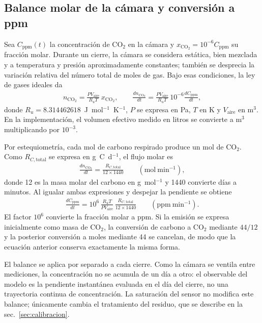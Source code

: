 \subsection{Balance molar de la cámara y conversión a ppm}

\label{sup:balance}
Sea $C_{\mathrm{ppm}}(t)$ la concentración de CO$_2$ en la cámara y
$x_{\mathrm{CO_2}} = 10^{-6}C_{\mathrm{ppm}}$ su fracción molar. Durante un
cierre, la cámara se considera estática, bien mezclada y a temperatura y
presión aproximadamente constantes; también se desprecia la variación
relativa del número total de moles de gas. Bajo esas condiciones, la ley de
gases ideales da
\begin{align*}
n_{\mathrm{CO_2}}
  = \frac{P V_{\mathrm{aire}}}{R_u T}\,x_{\mathrm{CO_2}},
\qquad
\frac{dn_{\mathrm{CO_2}}}{dt}
  = \frac{P V_{\mathrm{aire}}}{R_u T}\,10^{-6}
    \frac{dC_{\mathrm{ppm}}}{dt},
\end{align*}
donde $R_u = 8.314462618$~J~mol$^{-1}$~K$^{-1}$, $P$ se expresa en Pa,
$T$ en K y $V_{\mathrm{aire}}$ en m$^3$. En la implementación, el volumen
efectivo medido en litros se convierte a m$^3$ multiplicando por $10^{-3}$.

Por estequiometría, cada mol de carbono respirado produce un mol de CO$_2$.
Como $R_{C,\mathrm{total}}$ se expresa en g~C~d$^{-1}$, el flujo molar es
\begin{align*}
\frac{dn_{\mathrm{CO_2}}}{dt}
  = \frac{R_{C,\mathrm{total}}}{12 \times 1440}
  \qquad (\mathrm{mol~min^{-1}}),
\end{align*}
donde 12 es la masa molar del carbono en g~mol$^{-1}$ y 1440 convierte días
a minutos. Al igualar ambas expresiones y despejar la pendiente se obtiene
\begin{align*}
\frac{dC_{\mathrm{ppm}}}{dt}
  = 10^{6}\,\frac{R_u T}{P V_{\mathrm{aire}}}\,
    \frac{R_{C,\mathrm{total}}}{12 \times 1440}
  \qquad (\mathrm{ppm~min^{-1}}).
\end{align*}
El factor $10^6$ convierte la fracción molar a ppm. Si la emisión se expresa
inicialmente como masa de CO$_2$, la conversión de carbono a CO$_2$ mediante
$44/12$ y la posterior conversión a moles mediante 44 se cancelan, de modo
que la ecuación anterior conserva exactamente la misma forma.

El balance se aplica por separado a cada cierre. Como la cámara se ventila
entre mediciones, la concentración no se acumula de un día a otro: el
observable del modelo es la pendiente instantánea evaluada en el día del
cierre, no una trayectoria continua de concentración. La saturación del
sensor no modifica este balance; únicamente cambia el tratamiento del
residuo, que se describe en la sec.~\ref{sec:calibracion}.

